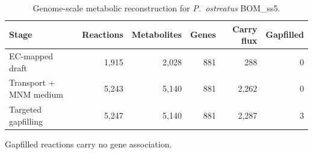 \begin{table}[htbp]
\caption{Genome-scale metabolic reconstruction for \textit{P.\ ostreatus} BOM\_ss5.}\label{tab:s7}
\footnotesize
\begin{tabular}{@{}lrrrrr@{}}
\toprule
Stage & Reactions & Metabolites & Genes & Carry flux & Gapfilled \\
\midrule
EC-mapped draft & 1,915 & 2,028 & 881 & 288 & 0 \\
Transport + MNM medium & 5,243 & 5,140 & 881 & 2,262 & 0 \\
Targeted gapfilling & 5,247 & 5,140 & 881 & 2,287 & 3 \\
\bottomrule
\end{tabular}
\begin{tablenotes}[flushleft]\footnotesize\item Gapfilled reactions carry no gene association.\end{tablenotes}
\end{table}
